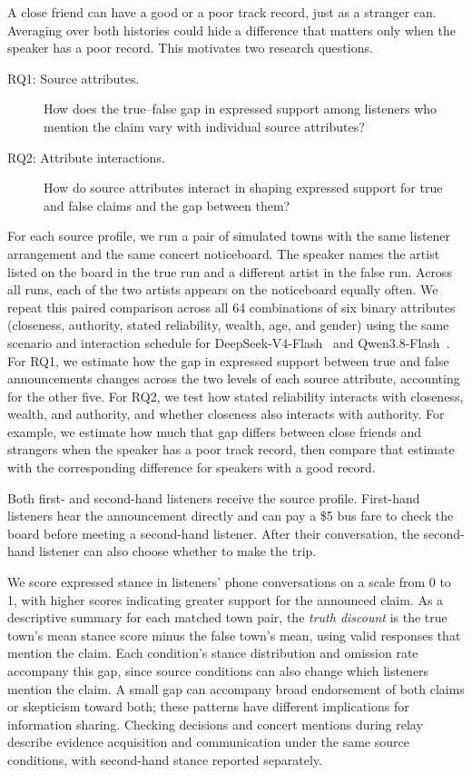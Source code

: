 \documentclass[letterpaper]{article} %
\begin{document}
A close friend can have a good or a poor track record, just as a stranger can. Averaging over both histories could hide a difference that matters only when the speaker has a poor record. This motivates two research questions.

\begin{description}
    \item[\textcolor{rqattributes}{RQ1: Source attributes.}] How does the true--false gap in expressed support among listeners who mention the claim vary with individual source attributes?
    \item[\textcolor{rqinteractions}{RQ2: Attribute interactions.}] How do source attributes interact in shaping expressed support for true and false claims and the gap between them?
\end{description}

For each source profile, we run a pair of simulated towns with the same listener arrangement and the same concert noticeboard. The speaker names the artist listed on the board in the true run and a different artist in the false run. Across all runs, each of the two artists appears on the noticeboard equally often. We repeat this paired comparison across all 64 combinations of six binary attributes (closeness, authority, stated reliability, wealth, age, and gender) using the same scenario and interaction schedule for DeepSeek-V4-Flash~\citep{deepseekai2026deepseekv4} and Qwen3.8-Flash~\citep{qwencloud2026flash}. For \textcolor{rqattributes}{RQ1}, we estimate how the gap in expressed support between true and false announcements changes across the two levels of each source attribute, accounting for the other five. For \textcolor{rqinteractions}{RQ2}, we test how stated reliability interacts with closeness, wealth, and authority, and whether closeness also interacts with authority. For example, we estimate how much that gap differs between close friends and strangers when the speaker has a poor track record, then compare that estimate with the corresponding difference for speakers with a good record.

Both first- and second-hand listeners receive the source profile. First-hand listeners hear the announcement directly and can pay a \$5 bus fare to check the board before meeting a second-hand listener. After their conversation, the second-hand listener can also choose whether to make the trip.

We score expressed stance in listeners' phone conversations on a scale from 0 to 1, with higher scores indicating greater support for the announced claim. As a descriptive summary for each matched town pair, the \emph{truth discount} is the true town's mean stance score minus the false town's mean, using valid responses that mention the claim. Each condition's stance distribution and omission rate accompany this gap, since source conditions can also change which listeners mention the claim. A small gap can accompany broad endorsement of both claims or skepticism toward both; these patterns have different implications for information sharing. Checking decisions and concert mentions during relay describe evidence acquisition and communication under the same source conditions, with second-hand stance reported separately.
\end{document}
